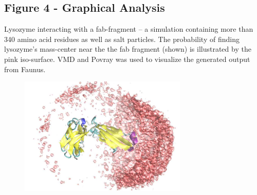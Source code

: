 \documentclass[10pt]{bmc_article}
\newenvironment{bmcformat}{\fussy\setboolean{publ}{true}}{\fussy}
\begin{document}
\begin{bmcformat}
  \subsection*{Figure 4 - Graphical Analysis}
     Lysozyme interacting with a fab-fragment -- a simulation containing
     more than 340 amino acid residues as well as salt particles.
     The probability of finding lysozyme's mass-center near
     the the fab fragment (shown) is illustrated by the pink iso-surface.
     VMD and Povray was used to visualize the generated output from Faunus.
     \begin{figure}[ht]\center
      \includegraphics[width=8cm]{pics/snapshot}
      \end{figure}

\end{bmcformat}
\end{document}
